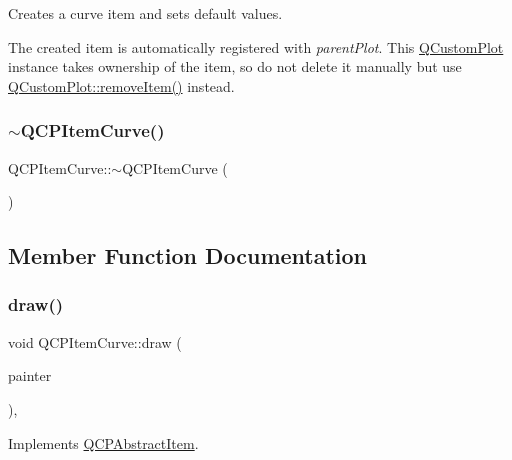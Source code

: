 Creates a curve item and sets default values.

The created item is automatically registered with {\itshape parent\+Plot}. This \mbox{\hyperlink{class_q_custom_plot}{Q\+Custom\+Plot}} instance takes ownership of the item, so do not delete it manually but use \mbox{\hyperlink{class_q_custom_plot_ae04446557292551e8fb6e2c106e1848d}{Q\+Custom\+Plot\+::remove\+Item()}} instead. \mbox{\label{class_q_c_p_item_curve_ae36f20fd5deff2f1443a7c53eaa95c81}} 
\subsubsection{\texorpdfstring{$\sim$QCPItemCurve()}{~QCPItemCurve()}}
{\footnotesize\ttfamily Q\+C\+P\+Item\+Curve\+::$\sim$\+Q\+C\+P\+Item\+Curve (\begin{DoxyParamCaption}{ }\end{DoxyParamCaption})\hspace{0.3cm}{\ttfamily [virtual]}}



\subsection{Member Function Documentation}
\mbox{\label{class_q_c_p_item_curve_a856ae61de18278847ba5e0e357bf68f2}} 
\subsubsection{\texorpdfstring{draw()}{draw()}}
{\footnotesize\ttfamily void Q\+C\+P\+Item\+Curve\+::draw (\begin{DoxyParamCaption}\item[{\mbox{\hyperlink{class_q_c_p_painter}{Q\+C\+P\+Painter}} $\ast$}]{painter }\end{DoxyParamCaption})\hspace{0.3cm}{\ttfamily [protected]}, {\ttfamily [virtual]}}



Implements \mbox{\hyperlink{class_q_c_p_abstract_item_a007fdab79c935a5da5aa04a21d268c18}{Q\+C\+P\+Abstract\+Item}}.

